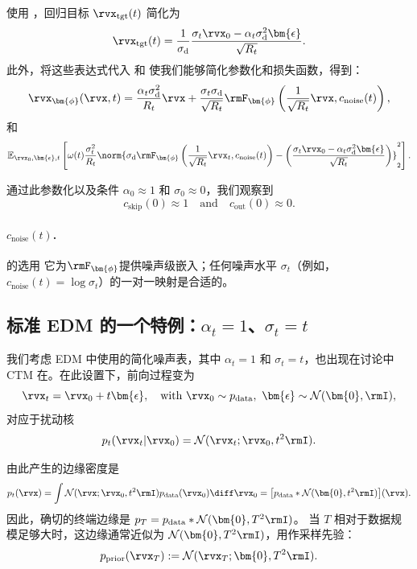 使用 ，回归目标 $\rvx_{\mathrm{tgt}}(t)$ 简化为
\[
\rvx_{\mathrm{tgt}}(t) = \frac{1}{\sigma_{\mathrm{d}}}\frac{\sigma_t \rvx_0 - \alpha_t \sigma_{\mathrm{d}}^2\bm{\epsilon} }{\sqrt{R_t}}.
\]
此外，将这些表达式代入  和  使我们能够简化参数化和损失函数，得到：
\begin{align*}
    \rvx_{\bm{\phi}}(\rvx, t)=\frac{\alpha_t \sigma_{\mathrm{d}}^2 }{R_t} \rvx + \frac{\sigma_t \sigma_{\mathrm{d}} }{\sqrt{R_t}}\rmF_{\bm{\phi}}\left(\frac{1}{\sqrt{R_t}}\rvx, c_{\mathrm{noise}}(t)\right),
\end{align*}
和
\begin{align*}
   \mathbb{E}_{\rvx_0, \bm{\epsilon}, t} \left[\omega(t)\frac{\sigma_t^2  }{R_t}\norm{ \sigma_{\mathrm{d}} \rmF_{\bm{\phi}}\left(\frac{1}{\sqrt{R_t}}\rvx_t, c_{\mathrm{noise}}(t)\right) - \left(\frac{\sigma_t \rvx_0 - \alpha_t \sigma_{\mathrm{d}}^2\bm{\epsilon} }{\sqrt{R_t}}\right)}_2^2\right].
\end{align*}

通过此参数化以及条件 $\alpha_0 \approx 1$ 和 $\sigma_0 \approx 0$，我们观察到
\[
c_{\mathrm{skip}}(0) \approx 1 \quad \text{and} \quad c_{\mathrm{out}}(0) \approx 0.
\]


\paragraph{$c_{\mathrm{noise}}(t)$.}的选用
它为$\rmF_{\bm{\phi}}$提供噪声级嵌入；任何噪声水平 $\sigma_t$（例如，$c_{\mathrm{noise}}(t)=\log \sigma_t$）的一对一映射是合适的。

\subsection{标准 EDM 的一个特例：$\alpha_t = 1$、$\sigma_t = t$}

我们考虑 EDM 中使用的简化噪声表，其中
$\alpha_t = 1$ 和 $\sigma_t = t$，也出现在讨论中
CTM 在。在此设置下，前向过程变为
\[
\rvx_t = \rvx_0 + t\bm{\epsilon},
\quad
\text{with }
\rvx_0 \sim p_{\text{data}},
\,\,
\bm{\epsilon} \sim \mathcal{N}(\bm{0}, \rmI),
\]
对应于扰动核
\[
p_t(\rvx_t|\rvx_0)
=
\mathcal{N}(\rvx_t; \rvx_0, t^2\rmI).
\]

由此产生的边缘密度是
\[
p_t(\rvx)
=
\int
\mathcal{N}(\rvx;\rvx_0,t^2\rmI)
p_{\mathrm{data}}(\rvx_0)
\diff\rvx_0
=
\bigl[
p_{\mathrm{data}}
*
\mathcal{N}(\bm{0},t^2\rmI)
\bigr](\rvx).
\]
因此，确切的终端边缘是
$p_T=p_{\mathrm{data}}*\mathcal{N}(\bm{0},T^2\rmI)$。
当 $T$ 相对于数据规模足够大时，这边缘通常近似为
$\mathcal{N}(\bm{0},T^2\rmI)$，用作采样先验：
\[
p_{\mathrm{prior}}(\rvx_T)
:=
\mathcal{N}(\rvx_T;\bm{0},T^2\rmI).
\]



